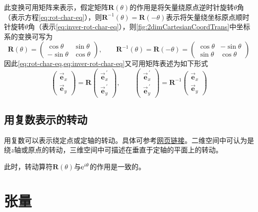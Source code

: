 此变换可用矩阵来表示，假定矩阵$\bm{R}(\theta)$的作用是将矢量绕原点逆时针旋转$\theta$角（表示方程\cref{eq:rot-char-eq}），则$\bm{R}^{-1}(\theta) = \bm{R}(-\theta)$表示将矢量绕坐标原点顺时针旋转$\theta$角（表示\cref{eq:inver-rot-char-eq}），则\cref{fig:2dimCartesianCoordTrans}中坐标系的变换可写为
\begin{equation}
    \bm{R}(\theta) = \begin{pmatrix}
        \cos{\theta} & \sin{\theta} \\
        -\sin{\theta} & \cos{\theta}
    \end{pmatrix},
    \qquad
    \bm{R}^{-1}(\theta) = \bm{R}(-\theta) = \begin{pmatrix}
        \cos{\theta} & -\sin{\theta} \\
        \sin{\theta} & \cos{\theta}
    \end{pmatrix}
\end{equation}
因此\cref{eq:rot-char-eq,eq:inver-rot-char-eq}又可用矩阵表述为如下形式
\begin{equation*}
    \begin{pmatrix}
        \vec{\bm{e}}_{x} \\
        \vec{\bm{e}}_{y}
    \end{pmatrix}
    = \bm{R} \begin{pmatrix}
        \vec{\bm{e}}_{x}^{\,\prime} \\
        \vec{\bm{e}}_{y}^{\,\prime}
    \end{pmatrix},
    \qquad
    \begin{pmatrix}
        \vec{\bm{e}}_{x}^{\,\prime} \\
        \vec{\bm{e}}_{y}^{\,\prime}
    \end{pmatrix}
    = \bm{R}^{-1} \begin{pmatrix}
        \vec{\bm{e}}_{x} \\
        \vec{\bm{e}}_{y}
    \end{pmatrix}
\end{equation*}

\subsection{用复数表示的转动}
用复数可以表示绕定点或定轴的转动。具体可参考\href{https://www.cnblogs.com/noluye/p/11964513.html}{网页链接}。二维空间中可认为是绕$z$轴或原点的转动，三维空间中可描述在垂直于定轴的平面上的转动。

此时，转动算符$\bm{R}(\theta)$与${\rm e}^{i\theta}$的作用是一致的。

\section{张量}

